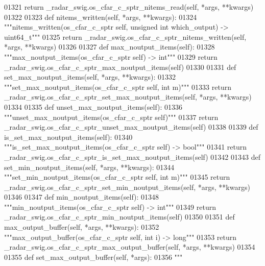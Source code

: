 \begin{DoxyCode}
{{{{{{01321         \textcolor{keywordflow}{return} \_radar\_swig.os\_cfar\_c\_sptr\_nitems\_read(self, *args, **kwargs)
01322 
01323     \textcolor{keyword}{def }nitems_written(self, *args, **kwargs):
01324         \textcolor{stringliteral}{"""nitems\_written(os\_cfar\_c\_sptr self, unsigned int which\_output) -> uint64\_t"""}
01325         \textcolor{keywordflow}{return} \_radar\_swig.os\_cfar\_c\_sptr\_nitems\_written(self, *args, **kwargs)
01326 
01327     \textcolor{keyword}{def }max_noutput_items(self):
01328         \textcolor{stringliteral}{"""max\_noutput\_items(os\_cfar\_c\_sptr self) -> int"""}
01329         \textcolor{keywordflow}{return} \_radar\_swig.os\_cfar\_c\_sptr\_max\_noutput\_items(self)
01330 
01331     \textcolor{keyword}{def }set_max_noutput_items(self, *args, **kwargs):
01332         \textcolor{stringliteral}{"""set\_max\_noutput\_items(os\_cfar\_c\_sptr self, int m)"""}
01333         \textcolor{keywordflow}{return} \_radar\_swig.os\_cfar\_c\_sptr\_set\_max\_noutput\_items(self, *args, **kwargs)
01334 
01335     \textcolor{keyword}{def }unset_max_noutput_items(self):
01336         \textcolor{stringliteral}{"""unset\_max\_noutput\_items(os\_cfar\_c\_sptr self)"""}
01337         \textcolor{keywordflow}{return} \_radar\_swig.os\_cfar\_c\_sptr\_unset\_max\_noutput\_items(self)
01338 
01339     \textcolor{keyword}{def }is_set_max_noutput_items(self):
01340         \textcolor{stringliteral}{"""is\_set\_max\_noutput\_items(os\_cfar\_c\_sptr self) -> bool"""}
01341         \textcolor{keywordflow}{return} \_radar\_swig.os\_cfar\_c\_sptr\_is\_set\_max\_noutput\_items(self)
01342 
01343     \textcolor{keyword}{def }set_min_noutput_items(self, *args, **kwargs):
01344         \textcolor{stringliteral}{"""set\_min\_noutput\_items(os\_cfar\_c\_sptr self, int m)"""}
01345         \textcolor{keywordflow}{return} \_radar\_swig.os\_cfar\_c\_sptr\_set\_min\_noutput\_items(self, *args, **kwargs)
01346 
01347     \textcolor{keyword}{def }min_noutput_items(self):
01348         \textcolor{stringliteral}{"""min\_noutput\_items(os\_cfar\_c\_sptr self) -> int"""}
01349         \textcolor{keywordflow}{return} \_radar\_swig.os\_cfar\_c\_sptr\_min\_noutput\_items(self)
01350 
01351     \textcolor{keyword}{def }max_output_buffer(self, *args, **kwargs):
01352         \textcolor{stringliteral}{"""max\_output\_buffer(os\_cfar\_c\_sptr self, int i) -> long"""}
01353         \textcolor{keywordflow}{return} \_radar\_swig.os\_cfar\_c\_sptr\_max\_output\_buffer(self, *args, **kwargs)
01354 
01355     \textcolor{keyword}{def }set_max_output_buffer(self, *args):
01356         \textcolor{stringliteral}{"""}
}}}}}}
\end{DoxyCode}
